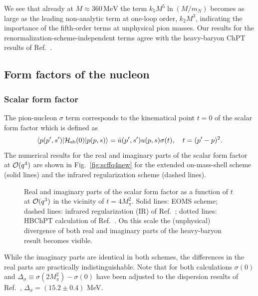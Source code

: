 \documentclass[twoside,12pt]{article}
\begin{document}
   We see that already at $M \approx 360\,\mbox{MeV}$ the
term $k_5 M^5 \ln(M/m_N)$ becomes as large as the leading
non-analytic term at one-loop order, $k_2 M^3$, indicating the
importance of the fifth-order terms at unphysical pion masses.
   Our results for the renormalization-scheme-independent terms agree
with the heavy-baryon ChPT results of Ref.~\cite{McGovern:1998tm}.

\subsection{Form factors of the nucleon}

\subsubsection{Scalar form factor}
   The pion-nucleon $\sigma$ term corresponds to the kinematical point
$t=0$ of the scalar form factor which is defined as
\begin{displaymath}
\langle p(p',s')|{\cal H_{\rm sb}}(0)|p(p,s)\rangle
=\bar{u}(p',s')u(p,s)\sigma(t),\quad t=(p'-p)^2.
\end{displaymath}
    The numerical results for the real and imaginary parts of the
scalar form factor at ${\cal O}(q^4)$ are shown in Fig.\
\ref{fig:scffq4new} for the extended on-mass-shell scheme
(solid lines) and the infrared regularization scheme (dashed lines).
\begin{figure}[t]
\begin{minipage}[t]{0.45\textwidth}
\begin{center}
\end{center}
\caption{Scalar form factor $\sigma(t)$ as a function of $t$ at
${\cal O}(q^4)$.}
\label{fig:scffq4new}
\end{minipage}
\hfill
\begin{minipage}[t]{0.45\textwidth}
\begin{center}
\end{center}
\caption{Real and imaginary parts of the scalar form factor as a function of
$t$ at ${\cal O}(q^3)$ in the vicinity of $t=4 M_\pi^2$.
Solid lines: EOMS scheme;
dashed lines: infrared regularization (IR) of Ref.\ \cite{Becher:1999he};
dotted lines: HBChPT calculation of Ref.\ \cite{Bernard:1992qa}.
On this scale the (unphysical) divergence of both real and imaginary parts
of the heavy-baryon result becomes visible.
}
\label{fig:scffq3thrnew}
\end{minipage}
\end{figure}
   While the imaginary parts are identical in both schemes, the
differences in the real parts are practically indistinguishable.
   Note that for both calculations $\sigma(0)$ and $\Delta_\sigma\equiv\sigma(2 M_\pi^2) -\sigma(0)$ have
been adjusted to the dispersion results of Ref.\ \cite{Gasser:1990ce}, $\Delta_\sigma=(15.2\pm 0.4)$ MeV.
\end{document}
